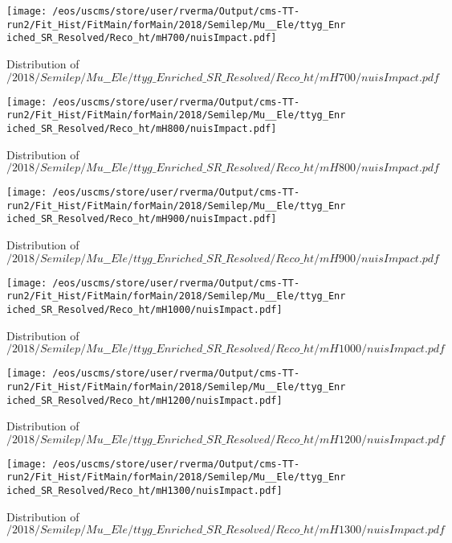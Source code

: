 \begin{figure}
\centering
\texttt{[image: /eos/uscms/store/user/rverma/Output/cms-TT-run2/Fit\_Hist/FitMain/forMain/2018/Semilep/Mu\_\_Ele/ttyg\_Enriched\_SR\_Resolved/Reco\_ht/mH700/nuisImpact.pdf]}
\caption{Distribution of $/2018/Semilep/Mu\_\_Ele/ttyg\_Enriched\_SR\_Resolved/Reco\_ht/mH700/nuisImpact.pdf$}
\end{figure}

\begin{figure}
\centering
\texttt{[image: /eos/uscms/store/user/rverma/Output/cms-TT-run2/Fit\_Hist/FitMain/forMain/2018/Semilep/Mu\_\_Ele/ttyg\_Enriched\_SR\_Resolved/Reco\_ht/mH800/nuisImpact.pdf]}
\caption{Distribution of $/2018/Semilep/Mu\_\_Ele/ttyg\_Enriched\_SR\_Resolved/Reco\_ht/mH800/nuisImpact.pdf$}
\end{figure}

\begin{figure}
\centering
\texttt{[image: /eos/uscms/store/user/rverma/Output/cms-TT-run2/Fit\_Hist/FitMain/forMain/2018/Semilep/Mu\_\_Ele/ttyg\_Enriched\_SR\_Resolved/Reco\_ht/mH900/nuisImpact.pdf]}
\caption{Distribution of $/2018/Semilep/Mu\_\_Ele/ttyg\_Enriched\_SR\_Resolved/Reco\_ht/mH900/nuisImpact.pdf$}
\end{figure}

\begin{figure}
\centering
\texttt{[image: /eos/uscms/store/user/rverma/Output/cms-TT-run2/Fit\_Hist/FitMain/forMain/2018/Semilep/Mu\_\_Ele/ttyg\_Enriched\_SR\_Resolved/Reco\_ht/mH1000/nuisImpact.pdf]}
\caption{Distribution of $/2018/Semilep/Mu\_\_Ele/ttyg\_Enriched\_SR\_Resolved/Reco\_ht/mH1000/nuisImpact.pdf$}
\end{figure}

\begin{figure}
\centering
\texttt{[image: /eos/uscms/store/user/rverma/Output/cms-TT-run2/Fit\_Hist/FitMain/forMain/2018/Semilep/Mu\_\_Ele/ttyg\_Enriched\_SR\_Resolved/Reco\_ht/mH1200/nuisImpact.pdf]}
\caption{Distribution of $/2018/Semilep/Mu\_\_Ele/ttyg\_Enriched\_SR\_Resolved/Reco\_ht/mH1200/nuisImpact.pdf$}
\end{figure}

\begin{figure}
\centering
\texttt{[image: /eos/uscms/store/user/rverma/Output/cms-TT-run2/Fit\_Hist/FitMain/forMain/2018/Semilep/Mu\_\_Ele/ttyg\_Enriched\_SR\_Resolved/Reco\_ht/mH1300/nuisImpact.pdf]}
\caption{Distribution of $/2018/Semilep/Mu\_\_Ele/ttyg\_Enriched\_SR\_Resolved/Reco\_ht/mH1300/nuisImpact.pdf$}
\end{figure}

